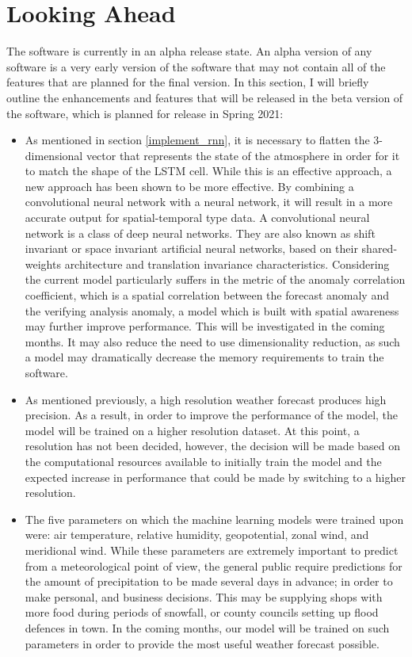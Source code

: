 \section{Looking Ahead}
The software is currently in an alpha release state. An alpha version of any software is a very early version of the software that may not contain all of the features that are planned for the final version\cite{alpha}. In this section, I will briefly outline the enhancements and features that will be released in the beta version of the software, which is planned for release in Spring 2021:

\begin{itemize}
    \item As mentioned in section \ref{implement_rnn}, it is necessary to flatten the 3-dimensional vector that represents the state of the atmosphere in order for it to match the shape of the LSTM cell. While this is an effective approach, a new approach has been shown to be more effective. By combining a convolutional neural network with a neural network, it will result in a more accurate output for spatial-temporal type data. A convolutional neural network is a class of deep neural networks. They are also known as shift invariant or space invariant artificial neural networks, based on their shared-weights architecture and translation invariance characteristics. Considering the current model particularly suffers in the metric of the anomaly correlation coefficient, which is a spatial correlation between the forecast anomaly and the verifying analysis anomaly, a model which is built with spatial awareness may further improve performance. This will be investigated in the coming months. It may also reduce the need to use dimensionality reduction, as such a model may dramatically decrease the memory requirements to train the software. 
    \item As mentioned previously, a high resolution weather forecast produces high precision. As a result, in order to improve the performance of the model, the model will be trained on a higher resolution dataset. At this point, a resolution has not been decided, however, the decision will be made based on the computational resources available to initially train the model and the expected increase in performance that could be made by switching to a higher resolution. 
    \item The five parameters on which the machine learning models were trained upon were: air temperature, relative humidity, geopotential, zonal wind, and meridional wind. While these parameters are extremely important to predict from a meteorological point of view, the general public require predictions for the amount of precipitation to be made several days in advance; in order to make personal, and business decisions. This may be supplying shops with more food during periods of snowfall, or county councils setting up flood defences in town. In the coming months, our model will be trained on such parameters in order to provide the most useful weather forecast possible.  
\end{itemize}
